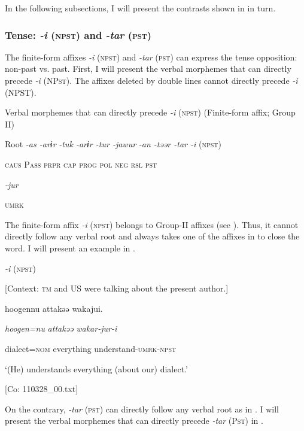 In the following subsections, I will present the contrasts shown in  in turn.

\subsubsection{Tense: \textit{{}-i} (\textsc{npst}) and \textit{{}-tar} (\textsc{pst})}

The finite-form affixes \textit{{}-i} (\textsc{npst}) and \textit{{}-tar} (\textsc{pst}) can express the tense opposition: non-past vs. past. First, I will present the verbal morphemes that can directly precede \textit{{}-i} (NP\textsc{st}). The affixes deleted by double lines cannot directly precede \textit{{}-i} (NPST).

\ea\label{ex:8-53}
  Verbal morphemes that can directly precede \textit{{}-i} (\textsc{npst}) (Finite-form affix; Group II)

  Root  \textit{{}-as  {}-arɨr} %
\textit{{}-tuk  {}-arɨr  {}-tur  {}-jawur} %
\textit{{}-an  {}-təər  {}-tar  {}-i} (\textsc{npst})

    \textsc{caus}  P\textsc{ass}  \textsc{prpr}  \textsc{cap}  \textsc{prog}  \textsc{pol}  \textsc{neg}  \textsc{rsl}  \textsc{pst}

          \textit{{}-jur} 

          \textsc{umrk}

The finite-form affix \textit{{}-i} (\textsc{npst}) belongs to Group-II affixes (see ). Thus, it cannot directly follow any verbal root and always takes one of the affixes in  to close the word. I will present an example in .

\ea\label{ex:8-54}
  \textit{{}-i} (\textsc{npst})

  [Context: \textsc{tm} and US were talking about the present author.]

  {\TM}
\glll  {\textbar}hoogen{\textbar}nu  attakəə  wakajui.

    \textit{hoogen=nu}  \textit{attakəə}  \textit{wakar-jur-i}

    dialect=\textsc{nom}  everything  understand-\textsc{umrk}-\textsc{npst}

    ‘(He) understands everything (about our) dialect.’

    [Co: 110328\_00.txt]
\z

  On the contrary, \textit{{}-tar} (\textsc{pst}) can directly follow any verbal root as in . I will present the verbal morphemes that can directly precede \textit{{}-tar} (P\textsc{st}) in .

